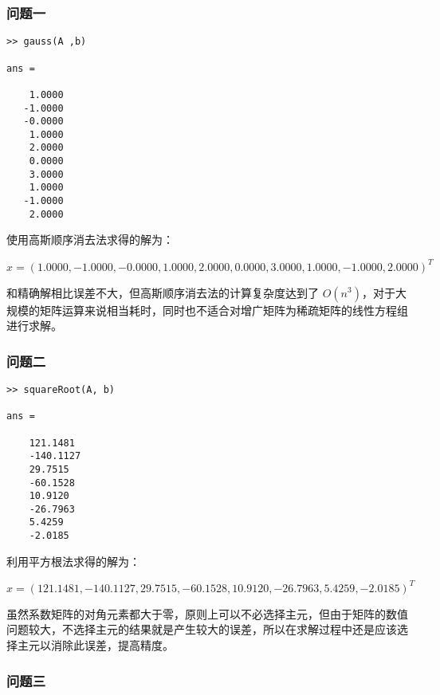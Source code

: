\subsubsection{问题一}

\begin{lstlisting}[frame=single]
>> gauss(A ,b)

ans =

    1.0000
   -1.0000
   -0.0000
    1.0000
    2.0000
    0.0000
    3.0000
    1.0000
   -1.0000
    2.0000

\end{lstlisting}

使用高斯顺序消去法求得的解为：

\[x = (1.0000, -1.0000, -0.0000, 1.0000, 2.0000, 0.0000, 3.0000, 1.0000, -1.0000, 2.0000)^T\]

和精确解相比误差不大，但高斯顺序消去法的计算复杂度达到了 $O(n^3)$，对于大规模的矩阵运算来说相当耗时，同时也不适合对增广矩阵为稀疏矩阵的线性方程组进行求解。

\subsubsection{问题二}

\begin{lstlisting}[frame=single]
>> squareRoot(A, b)

ans =

    121.1481
    -140.1127
    29.7515
    -60.1528
    10.9120
    -26.7963
    5.4259
    -2.0185

\end{lstlisting}

利用平方根法求得的解为：

\[x = (121.1481, -140.1127, 29.7515, -60.1528, 10.9120, -26.7963, 5.4259, -2.0185)^T\]

虽然系数矩阵的对角元素都大于零，原则上可以不必选择主元，但由于矩阵的数值问题较大，不选择主元的结果就是产生较大的误差，所以在求解过程中还是应该选择主元以消除此误差，提高精度。

\subsubsection{问题三}
